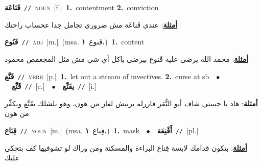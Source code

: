 \documentclass[10pt,a4paper,twoside]{article} %
\begin{document}
\begin{multicols}{2}
{\setlength\topsep{0pt}\textbf{\foreignlanguage{arabic}{قَنَاعَة}}\ {\color{gray}\texttt{//}\color{black}}\ \textsc{noun}\ [f.]\ \textbf{1.}~contentment  \textbf{2.}~conviction\  \begin{flushright}\color{gray}\foreignlanguage{arabic}{\textbf{\underline{\foreignlanguage{arabic}{أمثلة}}}: عندي قَناعَة مش ضروري تجامل جدا عحساب راحتك}\end{flushright}\color{black}} \vspace{2mm}

{\setlength\topsep{0pt}\textbf{\foreignlanguage{arabic}{قَنُوع}}\ {\color{gray}\texttt{//}\color{black}}\ \textsc{adj}\ [m.]\ \color{gray}(msa. \foreignlanguage{arabic}{قَنوع}~\foreignlanguage{arabic}{\textbf{١.}})\color{black}\ \textbf{1.}~content\  \begin{flushright}\color{gray}\foreignlanguage{arabic}{\textbf{\underline{\foreignlanguage{arabic}{أمثلة}}}: محمد الله يرضى عليه قَنوع بيرضى ياكل أي شي مش مثل المجعمص محمود}\end{flushright}\color{black}} \vspace{2mm}

{\setlength\topsep{0pt}\textbf{\foreignlanguage{arabic}{قَنَّع}}\ {\color{gray}\texttt{//}\color{black}}\ \textsc{verb}\ [p.]\ \textbf{1.}~let out a stream of invectives.  \textbf{2.}~curse at sb\ \ $\bullet$\ \ \setlength\topsep{0pt}\textbf{\foreignlanguage{arabic}{قَنِّع}}\ {\color{gray}\texttt{//}\color{black}}\ [c.]\ \ $\bullet$\ \ \setlength\topsep{0pt}\textbf{\foreignlanguage{arabic}{يقَنِّع}}\ {\color{gray}\texttt{//}\color{black}}\ [i.]\  \begin{flushright}\color{gray}\foreignlanguage{arabic}{\textbf{\underline{\foreignlanguage{arabic}{أمثلة}}}: هاد يا حبيبتي شاف أبو النُّقر فازرله بربيش لغاز من هون، وهو بلشلك يقَنِّع ويكفِّر من هون}\end{flushright}\color{black}} \vspace{2mm}

{\setlength\topsep{0pt}\textbf{\foreignlanguage{arabic}{قِنَاع}}\ {\color{gray}\texttt{//}\color{black}}\ \textsc{noun}\ [m.]\ \color{gray}(msa. \foreignlanguage{arabic}{قِناع}~\foreignlanguage{arabic}{\textbf{١.}})\color{black}\ \textbf{1.}~mask\ \ $\bullet$\ \ \setlength\topsep{0pt}\textbf{\foreignlanguage{arabic}{أَقْنِعَة}}\ {\color{gray}\texttt{//}\color{black}}\ [pl.]\  \begin{flushright}\color{gray}\foreignlanguage{arabic}{\textbf{\underline{\foreignlanguage{arabic}{أمثلة}}}: بتكون قدامك لابسة قِناع البراءة والمسكنة ومن وراك لو تشوفيها كف بتحكي عليك}\end{flushright}\color{black}} \vspace{2mm}


\end{multicols}
\end{document}
